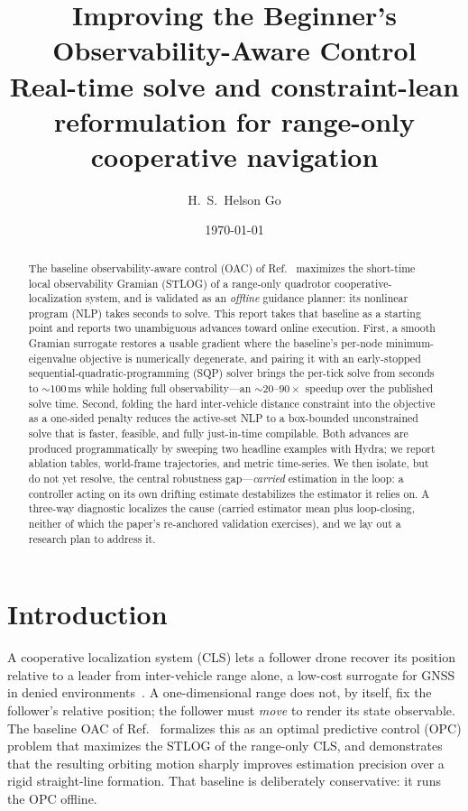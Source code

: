 \documentclass[11pt]{article}
\title{\textbf{Improving the Beginner's Observability-Aware Control}\\[2pt]
  \large Real-time solve and constraint-lean reformulation for range-only cooperative
  navigation}
\author{H.\ S.\ Helson Go}
\date{\today}
\begin{document}
\maketitle

\begin{abstract}
\noindent The baseline observability-aware control (OAC) of Ref.~\cite{jgcd} maximizes the
short-time local observability Gramian (STLOG) of a range-only quadrotor cooperative-localization
system, and is validated as an \emph{offline} guidance planner: its nonlinear program (NLP) takes
seconds to solve. This report takes that baseline as a starting point and reports two unambiguous
advances toward online execution. First, a smooth Gramian surrogate restores a usable gradient
where the baseline's per-node minimum-eigenvalue objective is numerically degenerate, and pairing
it with an early-stopped sequential-quadratic-programming (SQP) solver brings the per-tick solve
from seconds to $\sim\!100$\,ms while holding full observability---an $\sim\!20$--$90\times$
speedup over the published solve time. Second, folding the hard inter-vehicle distance constraint
into the objective as a one-sided penalty reduces the active-set NLP to a box-bounded
unconstrained solve that is faster, feasible, and fully just-in-time compilable. Both advances are
produced programmatically by sweeping two headline examples with Hydra; we report ablation tables,
world-frame trajectories, and metric time-series. We then isolate, but do not yet resolve, the
central robustness gap---\emph{carried} estimation in the loop: a controller acting on its own
drifting estimate destabilizes the estimator it relies on. A three-way diagnostic localizes the
cause (carried estimator mean plus loop-closing, neither of which the paper's re-anchored
validation exercises), and we lay out a research plan to address it.
\end{abstract}

\section{Introduction}\label{sec:intro}

A cooperative localization system (CLS) lets a follower drone recover its position relative to a
leader from inter-vehicle range alone, a low-cost surrogate for GNSS in denied
environments~\cite{jgcd}. A one-dimensional range does not, by itself, fix the follower's relative
position; the follower must \emph{move} to render its state observable. The baseline OAC of
Ref.~\cite{jgcd} formalizes this as an optimal predictive control (OPC) problem that maximizes the
STLOG of the range-only CLS, and demonstrates that the resulting orbiting motion sharply improves
estimation precision over a rigid straight-line formation. That baseline is deliberately
conservative: it runs the OPC offline.
\end{document}
